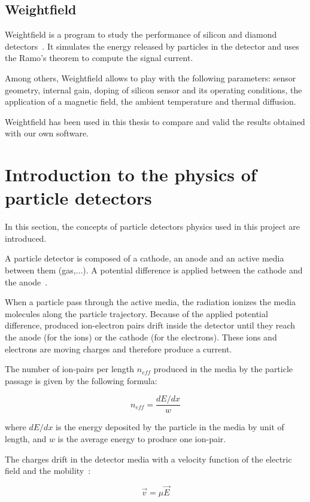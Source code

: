 \documentclass[11pt]{article}
\begin{document}
	\subsection{Weightfield}

Weightfield is a program to study the performance of silicon and diamond
detectors~\cite{Cenna2015}. It simulates the energy released by particles in the detector
and uses the Ramo's theorem to compute the signal current.

Among others, Weightfield allows to play with the following parameters:
sensor geometry, internal gain, doping of silicon sensor and its operating
conditions, the application of a magnetic field, the ambient temperature and
thermal diffusion.

Weightfield has been used in this thesis to compare and valid the results
obtained with our own software.

\section{Introduction to the physics of particle detectors}

In this section, the concepts of particle detectors physics used in this project
are introduced.

A particle detector is composed of a cathode, an anode and an active media
between them (gas,...). A potential difference is applied between the cathode
and the anode~\cite{lphy2236}.

When a particle pass through the active media, the radiation ionizes the media
molecules along the particle trajectory.
Because of the applied potential difference,
produced ion-electron pairs drift inside the detector until they reach the anode
(for the ions) or the cathode (for the electrons). These ions and electrons
are moving charges and therefore produce a current.

The number of ion-pairs per length $n_{eff}$ produced in the media by the
particle passage is given by the following formula:

\[n_{eff} = \frac{dE/dx}{w} \]

where $dE/dx$ is the energy deposited by the particle in the media by
unit of length, and $w$ is the average energy to produce one ion-pair.

The charges drift in the detector media with a velocity function of the electric
field and the mobility~\cite{spieler2005semiconductor}:

\[\vec{v} = \mu \vec{E}\]
\end{document}
